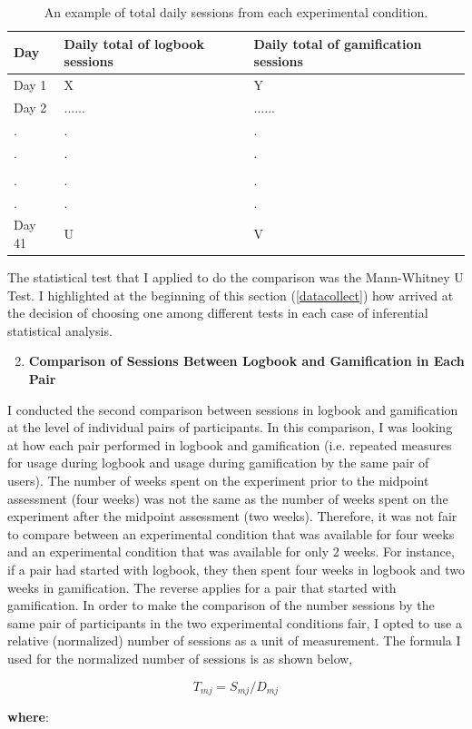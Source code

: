 \begin{table}[h!]
  \begin{center}
    \caption{An example of total daily sessions from each experimental condition.}
    \label{table:totaldailysessions}
	\begin{tabular}{|l|l|p{6cm}|}
		\hline
		Day&Daily total of logbook sessions&Daily total of gamification sessions\\
		\hline
		Day 1&X&Y\\
		\hline
		Day 2&......&...... \\
		\hline
		.&.&. \\ 
		.&.&. \\   
		 && \\  
		.&.&. \\ 
		.&.&. \\ 
		\hline
       	Day 41&U&V \\
		\hline
	\end{tabular}
  \end{center}
\end{table}

The statistical test that I applied to do the comparison was the Mann-Whitney U Test. I highlighted at the beginning of this section (\ref{datacollect}) how arrived at the decision of choosing one among different tests in each case of inferential statistical analysis. 
\begin{enumerate}[label=(\alph*)]
\setcounter{enumi}{1}
\item \textbf{Comparison of Sessions Between Logbook and Gamification in Each Pair}
\end{enumerate}
I conducted the second comparison between sessions in logbook and gamification at the level of individual pairs of participants. In this comparison, I was looking at how each pair performed in logbook and gamification (i.e. repeated measures for usage during logbook and usage during gamification by the same pair of users). The number of weeks spent on the experiment prior to the midpoint assessment (four weeks) was not the same as the number of weeks spent on the experiment after the midpoint assessment (two weeks). Therefore, it was not fair to compare between an experimental condition that was available for four weeks and an experimental condition that was available for only 2 weeks. For instance, if a pair had started with logbook, they then spent four weeks in logbook and two weeks in gamification. The reverse applies for a pair that started with gamification. In order to make the comparison of the number sessions by the same pair of participants in the two experimental conditions fair, I opted to use a relative (normalized) number of sessions  as a unit of measurement. The formula I used for the normalized number of sessions is as shown below,
\begin{mdframed}[style=MyFrame]
$$T_{mj}=S_{mj}/D_{mj}$$
\end{mdframed}
\textbf{where}:

